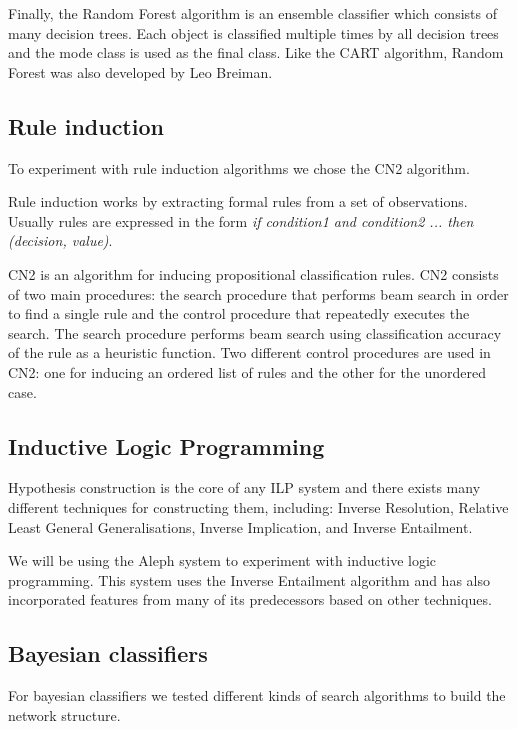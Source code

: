 \documentclass[a4paper]{llncs}
\begin{document}
Finally, the Random Forest algorithm is an ensemble classifier which consists of many decision trees.
Each object is classified multiple times by all decision trees and the mode class is used as the final class.
Like the CART algorithm, Random Forest was also developed by Leo Breiman.

\subsection{Rule induction}

To experiment with rule induction algorithms we chose the CN2 \cite{cn2} algorithm.

Rule induction works by extracting formal rules from a set of observations.
Usually rules are expressed in the form \textit{if condition1 and condition2 ... then (decision, value)}.

CN2 is an algorithm for inducing 
propositional classification rules. CN2 consists of two main procedures: the 
search procedure that performs beam search in order to find a single rule and 
the control procedure that repeatedly executes the search. 
The search procedure performs beam search using classification accuracy 
of the rule as a heuristic function.
Two different control procedures are used in CN2: one for inducing an ordered 
list of rules and the other for the unordered case.

\subsection{Inductive Logic Programming}

Hypothesis construction is the core of any ILP system and there exists many different techniques for constructing them, including: Inverse Resolution, Relative Least General Generalisations, Inverse Implication, and Inverse Entailment.

We will be using the Aleph system \cite{aleph} to experiment with inductive logic programming. This system
uses the Inverse Entailment algorithm and has also incorporated features from many of its predecessors based on other techniques.

\subsection{Bayesian classifiers}

For bayesian classifiers we tested different kinds of search algorithms to build
the network structure.
\end{document}
